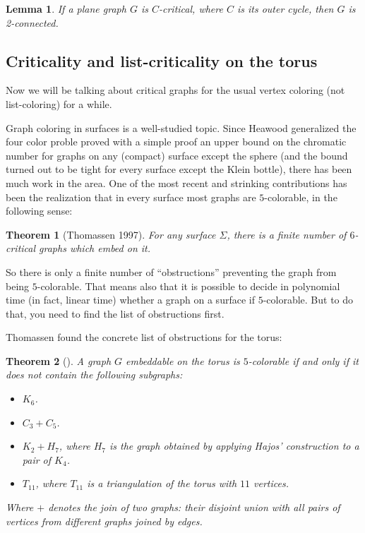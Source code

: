 \documentclass{article}
\newtheorem{theorem}{Theorem}
\newtheorem{lemma}{Lemma}
\begin{document}
\begin{lemma}
If a plane graph $G$ is $C$-critical, where $C$ is its outer cycle, then $G$ is 2-connected.
\end{lemma}




\subsection{Criticality and list-criticality on the torus}

Now we will be talking about critical graphs for the usual vertex coloring (not list-coloring) for a while.

Graph coloring in surfaces is a well-studied topic. Since Heawood generalized the four color proble proved with a simple proof an upper bound on the chromatic number for graphs on any (compact) surface except the sphere (and the bound turned out to be tight for every surface except the Klein bottle), there has been much work in the area. One of the most recent and strinking contributions has been the realization that in every surface most graphs are $5$-colorable, in the following sense:

\begin{theorem}[Thomassen 1997]
For any surface $\Sigma$, there is a finite number of $6$-critical graphs which embed on it.
\end{theorem}

So there is only a finite number of ``obstructions'' preventing the graph from being $5$-colorable. That means also that it is possible to decide in polynomial time (in fact, linear time) whether a graph on a surface if $5$-colorable. But to do that, you need to find the list of obstructions first.

Thomassen found the concrete list of obstructions for the torus:

\begin{theorem}[\cite{thomassentorus}]
A graph $G$ embeddable on the torus is $5$-colorable if and only if it does not contain the following subgraphs:
\begin{itemize}
\item $K_6$.
\item $C_3 + C_5$.
\item $K_2 + H_7$, where $H_7$ is the graph obtained by applying \emph{Hajos'} construction to a pair of $K_4$.
\item $T_{11}$, where $T_{11}$ is a triangulation of the torus with $11$ vertices.
\end{itemize}
Where $+$ denotes the join of two graphs: their disjoint union with all pairs of vertices from different graphs joined by edges.
\end{theorem} 
\end{document}
